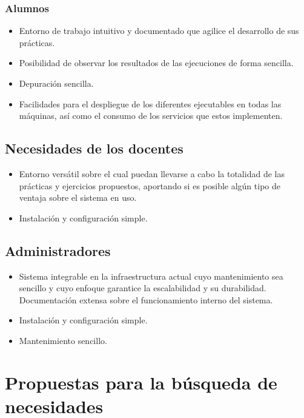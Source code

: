 \subsubsection{Alumnos}

\begin{itemize}
  \item Entorno de trabajo intuitivo y documentado que agilice el desarrollo de sus prácticas.
  \item Posibilidad de observar los resultados de las ejecuciones de forma sencilla.
  \item Depuración sencilla.
  \item Facilidades para el despliegue de los diferentes ejecutables en todas las máquinas, así como el consumo de los servicios que estos implementen.
\end{itemize}

\subsection{Necesidades de los docentes}

\begin{itemize}
  \item Entorno versátil sobre el cual puedan llevarse a cabo la totalidad de las prácticas y ejercicios propuestos, aportando si es posible algún tipo de ventaja sobre el sistema en uso.
  \item Instalación y configuración simple.
\end{itemize}

\subsection{Administradores}

\begin{itemize}
  \item Sistema integrable en la infraestructura actual cuyo mantenimiento sea sencillo y cuyo enfoque garantice la escalabilidad y su durabilidad. Documentación extensa sobre el funcionamiento interno del sistema.
  \item Instalación y configuración simple.
  \item Mantenimiento sencillo.
\end{itemize}

\section{Propuestas para la búsqueda de necesidades}

